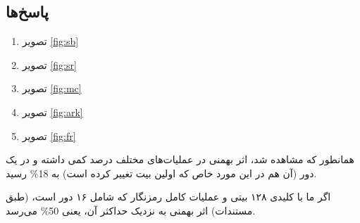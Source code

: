 \documentclass[dvipsnames, svgnames, x11names]{article}
\begin{document}
\subsection{پاسخ‌ها}
\begin{enumerate}[label=\alph*)]
\item {}
تصویر
\ref{fig:sb}

\item {}
تصویر
\ref{fig:sr}

\item {}
تصویر
\ref{fig:mc}

\item {}
تصویر
\ref{fig:ark}

\item {}
تصویر
\ref{fig:fr}
\end{enumerate}

همانطور که مشاهده شد، اثر بهمنی در عملیات‌های مختلف درصد کمی داشته و در یک دور (آن هم در این مورد خاص که اولین بیت تغییر کرده است) به 18\% رسید.

اگر ما با کلیدی ۱۲۸ بیتی و عملیات کامل رمزنگار
که شامل ۱۶ دور است، (طبق مستندات) اثر بهمنی به نزدیک حداکثر آن، یعنی 50\% می‌رسد.


\begin{figure}[b]
\begin{center}
\end{center}
\end{figure}
\end{document}
